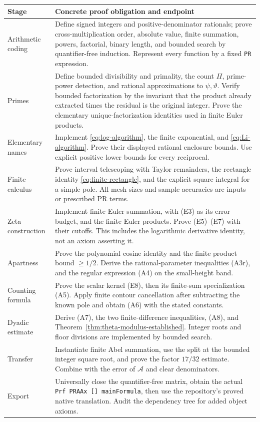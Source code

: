 \begin{longtable}{@{}p{}p{}@{}}
\toprule
Stage & Concrete proof obligation and endpoint\\
\midrule
\endhead
Arithmetic coding & Define signed integers and positive-denominator rationals;
prove cross-multiplication order, absolute value, finite summation, powers,
factorial, binary length, and bounded search by quantifier-free induction.
Represent every function by a fixed \texttt{PR} expression.\\[3pt]
Primes & Define bounded divisibility and primality, the count $\Pi$,
prime-power detection, and rational approximations to $\psi,\vartheta$.
Verify bounded factorization by the invariant that the product already
extracted times the residual is the original integer. Prove the elementary
unique-factorization identities used in finite Euler products.\\[3pt]
Elementary names & Implement \eqref{eq:log-algorithm}, the finite exponential,
and \eqref{eq:Li-algorithm}. Prove their displayed rational enclosure bounds.
Use explicit positive lower bounds for every reciprocal.\\[3pt]
Finite calculus & Prove interval telescoping with Taylor remainders, the
rectangle identity \eqref{eq:finite-rectangle}, and the explicit square
integral for a simple pole. All mesh sizes and sample accuracies are inputs
or prescribed PR terms.\\[3pt]
Zeta construction & Implement finite Euler summation, with (E3) as its
error budget, and the finite Euler products. Prove (E5)--(E7) with their
cutoffs. This includes the logarithmic derivative identity, not an axiom
asserting it.\\[3pt]
Apartness & Prove the polynomial cosine identity and the finite product
bound $\ge1/2$. Derive the rational-parameter inequalities (A3r), and
the regular expression (A4) on the small-height band.\\[3pt]
Counting formula & Prove the scalar kernel (E8), then its finite-sum
specialization (A5). Apply finite contour cancellation after subtracting the
known pole and obtain (A6) with the stated constants.\\[3pt]
Dyadic estimate & Derive (A7), the two finite-difference inequalities,
(A8), and Theorem~\ref{thm:theta-modulus-established}. Integer roots and
floor divisions are implemented by bounded search.\\[3pt]
Transfer & Instantiate finite Abel summation, use the split at the bounded
integer square root, and prove the factor $17/32$ estimate. Combine with
the error of $\mathcal A$ and clear denominators.\\[3pt]
Export & Universally close the quantifier-free matrix, obtain the actual
\texttt{Prf PRAAx [] mainFormula}, then use the repository's proved
native translation. Audit the dependency tree for added object axioms.\\
\bottomrule
\end{longtable}

